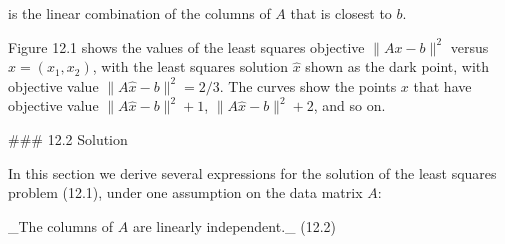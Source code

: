 is the linear combination of the columns of \(A\) that is closest to \(b\).

Figure 12.1 shows the values of the least squares objective \(\|Ax-b\|^{2}\) versus \(x=(x_{1},x_{2})\), with the least squares solution \(\hat{x}\) shown as the dark point, with objective value \(\|A\hat{x}-b\|^{2}=2/3\). The curves show the points \(x\) that have objective value \(\|A\hat{x}-b\|^{2}+1\), \(\|A\hat{x}-b\|^{2}+2\), and so on.

### 12.2 Solution

In this section we derive several expressions for the solution of the least squares problem (12.1), under one assumption on the data matrix \(A\):

_The columns of \(A\) are linearly independent._ (12.2) 